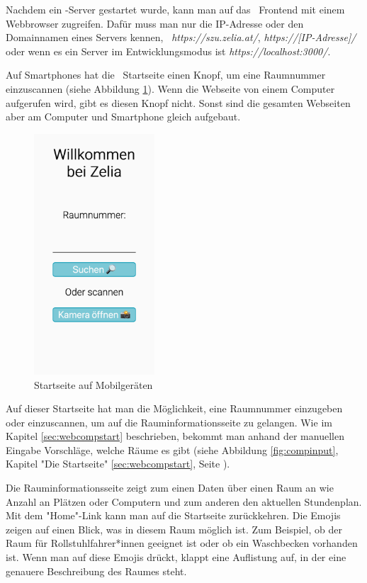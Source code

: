 Nachdem ein \ZELIA-Server gestartet wurde, kann man auf das \ZELIA\ Frontend mit einem Webbrowser zugreifen. Dafür muss man nur die IP-Adresse oder den Domainnamen eines Servers kennen, \zb\ \emph{https://szu.zelia.at/}, \emph{https://[IP-Adresse]/} oder wenn es ein Server im Entwicklungsmodus ist \emph{https://localhost:3000/}.

Auf Smartphones hat die \ZELIA\ Startseite einen Knopf, um eine Raumnummer einzuscannen (siehe Abbildung \ref{fig:zeliastart}). Wenn die Webseite von einem Computer aufgerufen wird, gibt es diesen Knopf nicht. Sonst sind die gesamten Webseiten aber am Computer und Smartphone gleich aufgebaut.

\begin{figure}[H]
    \centering
    \includegraphics[height=90mm]{media/Handbuch/zelia_start.png}
    \caption{Startseite auf Mobilgeräten}
    \label{fig:zeliastart}
\end{figure}

Auf dieser Startseite hat man die Möglichkeit, eine Raumnummer einzugeben oder einzuscannen, um auf die Rauminformationsseite zu gelangen. Wie im Kapitel \ref{sec:webcompstart} beschrieben, bekommt man anhand der manuellen Eingabe Vorschläge, welche Räume es gibt (siehe Abbildung \ref{fig:compinput}, Kapitel "Die Startseite" \ref{sec:webcompstart}, Seite \pageref{sec:webcompstart}). 

Die Rauminformationsseite zeigt zum einen Daten über einen Raum an wie Anzahl an Plätzen oder Computern und zum anderen den aktuellen Stundenplan. Mit dem "Home"-Link kann man auf die Startseite zurückkehren. Die Emojis zeigen auf einen Blick, was in diesem Raum möglich ist. Zum Beispiel, ob der Raum für Rollstuhlfahrer*innen geeignet ist oder ob ein Waschbecken vorhanden ist. Wenn man auf diese Emojis drückt, klappt eine Auflistung auf, in der eine genauere Beschreibung des Raumes steht.


